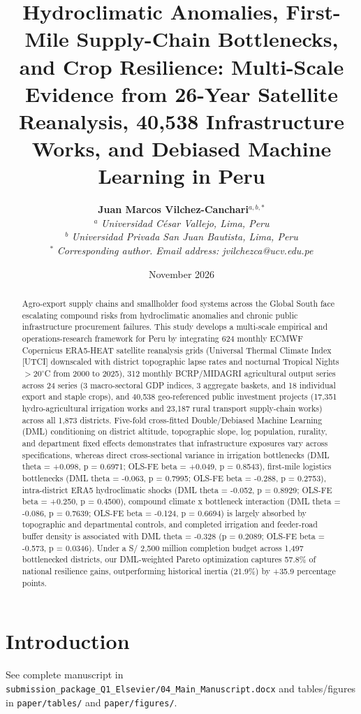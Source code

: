 \documentclass[11pt,a4paper]{article}
\title{\textbf{Hydroclimatic Anomalies, First-Mile Supply-Chain Bottlenecks, and Crop Resilience: Multi-Scale Evidence from 26-Year Satellite Reanalysis, 40,538 Infrastructure Works, and Debiased Machine Learning in Peru}}
\author{\textbf{Juan Marcos Vilchez-Canchari}$^{a,b,*}$ \\
\small $^a$ \textit{Universidad C\'esar Vallejo, Lima, Peru} \\
\small $^b$ \textit{Universidad Privada San Juan Bautista, Lima, Peru} \\
\small $^*$ \textit{Corresponding author. Email address: jvilchezca@ucv.edu.pe}}
\date{November 2026}
\begin{document}
\maketitle

\begin{abstract}
Agro-export supply chains and smallholder food systems across the Global South face escalating compound risks from hydroclimatic anomalies and chronic public infrastructure procurement failures. This study develops a multi-scale empirical and operations-research framework for Peru by integrating 624 monthly ECMWF Copernicus ERA5-HEAT satellite reanalysis grids (Universal Thermal Climate Index [UTCI] downscaled with district topographic lapse rates and nocturnal Tropical Nights $>20^\circ$C from 2000 to 2025), 312 monthly BCRP/MIDAGRI agricultural output series across 24 series (3 macro-sectoral GDP indices, 3 aggregate baskets, and 18 individual export and staple crops), and 40,538 geo-referenced public investment projects (17,351 hydro-agricultural irrigation works and 23,187 rural transport supply-chain works) across all 1,873 districts. Five-fold cross-fitted Double/Debiased Machine Learning (DML) conditioning on district altitude, topographic slope, log population, rurality, and department fixed effects demonstrates that infrastructure exposures vary across specifications, whereas direct cross-sectional variance in irrigation bottlenecks (DML theta = +0.098, p = 0.6971; OLS-FE beta = +0.049, p = 0.8543), first-mile logistics bottlenecks (DML theta = -0.063, p = 0.7995; OLS-FE beta = -0.288, p = 0.2753), intra-district ERA5 hydroclimatic shocks (DML theta = -0.052, p = 0.8929; OLS-FE beta = +0.250, p = 0.4500), compound climate x bottleneck interaction (DML theta = -0.086, p = 0.7639; OLS-FE beta = -0.124, p = 0.6694) is largely absorbed by topographic and departmental controls, and completed irrigation and feeder-road buffer density is associated with DML theta = -0.328 (p = 0.2089; OLS-FE beta = -0.573, p = 0.0346). Under a S/ 2,500 million completion budget across 1,497 bottlenecked districts, our DML-weighted Pareto optimization captures 57.8\% of national resilience gains, outperforming historical inertia (21.9\%) by +35.9 percentage points.
\end{abstract}

\section{Introduction}
See complete manuscript in \texttt{submission\_package\_Q1\_Elsevier/04\_Main\_Manuscript.docx} and tables/figures in \texttt{paper/tables/} and \texttt{paper/figures/}.
\end{document}
